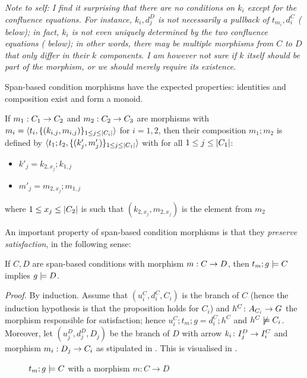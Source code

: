 \medskip\noindent
\emph{Note to self: I find it surprising that there are no conditions on $k_i$ except for the confluence equations. For instance, $k_i,d_j^D$ is \emph{not} necessarily a pullback of $t_{m_i},d_i^C$ ( below); in fact, $k_i$ is \emph{not even} uniquely determined by the two confluence equations ( below); in other words, there may be multiple morphisms from $C$ to $D$ that only differ in their $k$ components. I am however not sure if $k$ itself should be part of the morphism, or we should merely require its existence.}

\medskip\noindent Span-based condition morphisms have the expected properties: identities and composition exist and form a monoid.

\begin{definition}
\end{definition}

\begin{definition}
  If $m_1:C_1\rightarrow C_2$ and $m_2:C_2\rightarrow C_3$ are morphisms with $m_i=\langle{t_i,\{{(k_{i,j},m_{i,j})}\}_{1\leq j\leq |{C_i}|}}\rangle$ for $i=1,2$, then their composition $m_1;m_2$ is defined by $\langle{t_1;t_2,\{{(k'_j,m'_j)}\}_{1\leq j\leq |{C_1}|}}\rangle$ with for all $1\leq j\leq |{C_1}|$:
  \begin{itemize}
  \item $k'_j=k_{2,x_j};k_{1,j}$
  \item $m'_j=m_{2,x_j};m_{1,j}$
  \end{itemize}
  where $1\leq x_j\leq |{C_2}|$ is such that $(k_{2,x_j},m_{2,x_j})$ is the element from $m_2$ 
\end{definition}

\begin{proposition}
\end{proposition}

\medskip\noindent An important property of span-based condition morphisms is that they \emph{preserve satisfaction}, in the following sense:
%
\begin{proposition}
If $C,D$ are span-based conditions with morphism $m:C\rightarrow D$, then $t_m;g\models C$ implies $g\models D$.
\end{proposition}
%
\emph{Proof.} By induction. Assume that $(u_i^C,d_i^C,C_i)$ is the branch of $C$ (hence the induction hypothesis is that the proposition holds for $C_i$) and $h^C\colon A_{C_i}\rightarrow G$ the morphism responsible for satisfaction; hence $u_i^C;t_m;g=d_i^C;h^C$ and $h^C\not\models C_i$. Moreover, let $(u_j^D,d_j^D,D_j)$ be the branch of $D$ with arrow $k_i\colon I_j^D\rightarrow I_i^C$ and morphism $m_i:D_j\rightarrow C_i$ as stipulated in . This is visualised in .
%
\begin{figure}
  \centering
  
  \caption{$t_m;g\models C$ with a morphism $m:C\rightarrow D$}
\end{figure}

